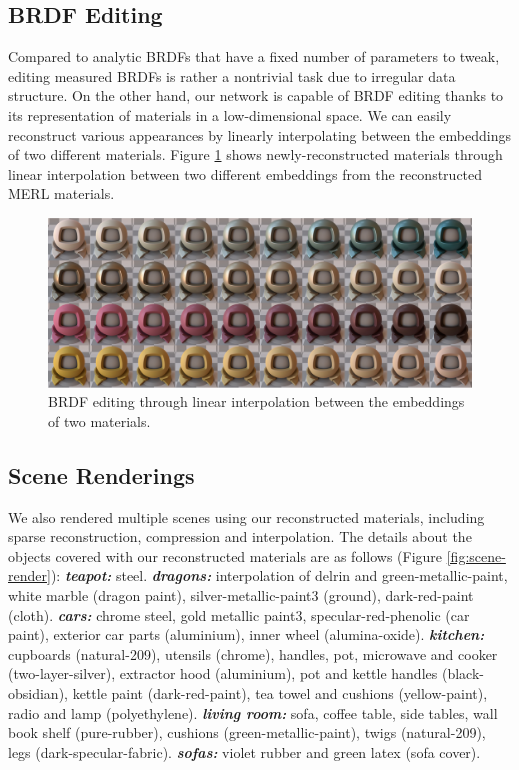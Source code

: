 \subsection{BRDF Editing}

Compared to analytic BRDFs that have a fixed number of parameters to tweak, editing measured BRDFs is rather a nontrivial task due to irregular data structure. On the other hand, our network is capable of BRDF editing thanks to its representation of materials in a low-dimensional space. We can easily reconstruct various appearances by linearly interpolating between the embeddings of two different materials. Figure \ref{fig:interpolation} shows newly-reconstructed materials through linear interpolation between two different embeddings from the reconstructed MERL materials. 


\begin{figure}[ht]
  \centering
   \includegraphics[width=0.9\linewidth]{Chapters/hyperbrdf-figs/interpolation_extended.pdf}

   \caption{BRDF editing through linear interpolation between the embeddings of two materials.}
   \label{fig:interpolation}
\end{figure}


\subsection{Scene Renderings}
We also rendered multiple scenes \cite{resources16} using our reconstructed materials, including sparse reconstruction, compression and interpolation. The details about the objects covered with our reconstructed materials are as follows (Figure \ref{fig:scene-render}): \textbf{\textit{teapot:}} steel. \textbf{\textit{dragons:}} interpolation of delrin and green-metallic-paint, white marble (dragon paint), silver-metallic-paint3 (ground), dark-red-paint (cloth). \textbf{\textit{cars:}} chrome steel, gold metallic paint3, specular-red-phenolic (car paint), exterior car parts (aluminium), inner wheel (alumina-oxide). \textbf{\textit{kitchen:}} cupboards (natural-209), utensils (chrome), handles, pot, microwave and cooker (two-layer-silver), extractor hood (aluminium), pot and kettle handles (black-obsidian), kettle paint (dark-red-paint), tea towel and cushions (yellow-paint), radio and lamp (polyethylene). \textbf{\textit{living room:}} sofa, coffee table, side tables, wall book shelf (pure-rubber), cushions (green-metallic-paint), twigs (natural-209), legs (dark-specular-fabric).
\textbf{\textit{sofas:}} violet rubber and green latex (sofa cover). 

